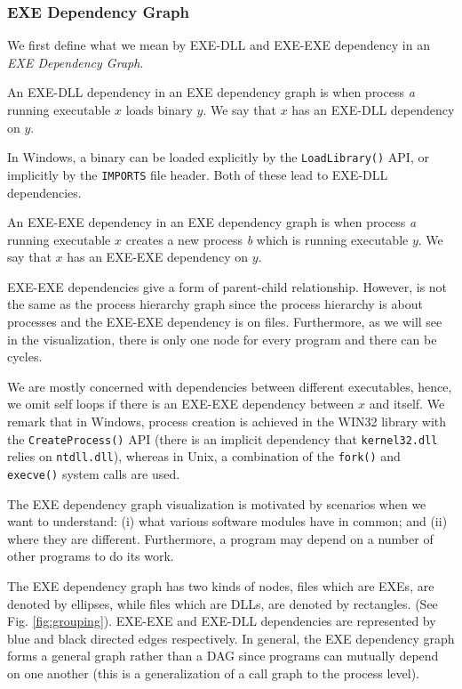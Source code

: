 \subsubsection{EXE Dependency Graph}
\label{sec:exe-dep-graph}

We first define what we mean by EXE-DLL and EXE-EXE dependency in
an {\em EXE Dependency Graph}.

\begin{definition}
An EXE-DLL dependency in an EXE dependency graph
is when process {\em a} running executable
$x$ loads binary $y$.
We say that $x$ has an EXE-DLL dependency on $y$.
\end{definition}
In Windows, a binary can be loaded explicitly by the {\tt LoadLibrary()} API,
or implicitly by the {\tt IMPORTS} file header.
Both of these lead to EXE-DLL dependencies.

\begin{definition}
An EXE-EXE dependency in an EXE dependency graph
is when process {\em a} running executable $x$ creates
a new process {\em b} which is running executable $y$.
We say that $x$ has an EXE-EXE dependency on $y$.
\end{definition}

EXE-EXE dependencies give a form of parent-child relationship.
However, is not the same as the process hierarchy graph
since the process hierarchy is about processes and the EXE-EXE
dependency is on files.
Furthermore, as we will see in the visualization,
there is only one node for every program and there can be cycles.

We are mostly concerned with dependencies between different executables,
hence, we omit self loops if there is an EXE-EXE dependency between $x$ and
itself.
We remark that in Windows, process creation is achieved in the WIN32 library
with the {\tt CreateProcess()} API (there
is an implicit dependency that {\tt kernel32.dll} relies on {\tt ntdll.dll}),
where\-as in Unix, a combination of the
{\tt fork()} and {\tt execve()} system calls
are used.

The EXE dependency graph visualization is motivated by scenarios when
we want to understand: (i) what various software modules have in common;
and (ii) where they are different.
Furthermore, a program may depend
on a number of other programs to do its work.

The EXE dependency graph has two kinds of nodes,
files which are EXEs, are denoted by ellipses, while
files which are DLLs, are denoted by rectangles.
(See Fig. \ref{fig:grouping}).
EXE-EXE and EXE-DLL dependencies are represented by
blue and black directed edges respectively.
In general, the EXE dependency graph forms a general graph rather than a
DAG since programs can mutually depend on one another
(this is a generalization of a call graph to the process level).

